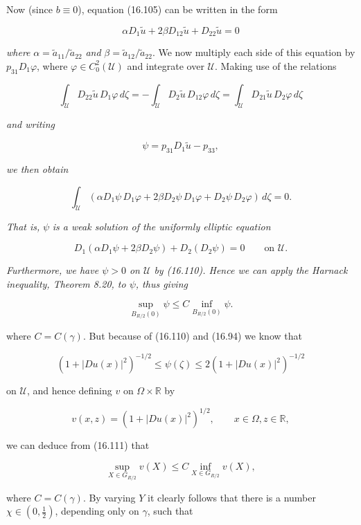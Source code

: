Now (since $b \equiv 0$), equation (16.105) can be written in the form

\[
\alpha D_1 \tilde u + 2\beta D_{12}\tilde u + D_{22}\tilde u = 0
\]

\emph{where} $\alpha = \tilde a_{11}/\tilde a_{22}$ \emph{and} $\beta = \tilde a_{12}/\tilde a_{22}$.
We now multiply each side of this equation by $p_{31}D_1\varphi$, where
$\varphi \in C_0^2(\mathcal U)$ and integrate over $\mathcal U$.
Making use of the relations

\[
\int_{\mathcal U} D_{22}\tilde u\,D_1\varphi\,d\zeta
= -\int_{\mathcal U} D_2\tilde u\,D_{12}\varphi\,d\zeta
= \int_{\mathcal U} D_{21}\tilde u\,D_2\varphi\,d\zeta
\]

\emph{and writing}

\[
\psi = p_{31}D_1\tilde u - p_{33},
\]

\emph{we then obtain}

\[
\int_{\mathcal U} \left(\alpha D_1\psi\,D_1\varphi + 2\beta D_2\psi\,D_1\varphi + D_2\psi\,D_2\varphi\right)\,d\zeta = 0.
\]

\emph{That is,} $\psi$ \emph{is a weak solution of the uniformly elliptic equation}

\[
D_1(\alpha D_1\psi + 2\beta D_2\psi) + D_2(D_2\psi)=0
\qquad \text{on } \mathcal U.
\]

\emph{Furthermore, we have $\psi > 0$ on $\mathcal U$ by (16.110). Hence we can apply the Harnack
inequality, Theorem 8.20, to $\psi$, thus giving}

\begin{equation}
\sup_{B_{R/2}(0)} \psi \le C \inf_{B_{R/2}(0)} \psi.
\tag{16.111}
\end{equation}



where $C=C(\gamma)$. But because of (16.110) and (16.94) we know that

\[
(1+|Du(x)|^2)^{-1/2}\leq \psi(\zeta)\leq 2(1+|Du(x)|^2)^{-1/2}
\]

on $\mathcal{U}$, and hence defining $v$ on $\Omega\times\mathbb{R}$ by

\[
v(x,z)=(1+|Du(x)|^2)^{1/2}, \qquad x\in \Omega, z\in \mathbb{R},
\]

we can deduce from (16.111) that

\[
\sup_{X\in G_{R/2}} v(X)\leq C \inf_{X\in G_{R/2}} v(X),
\]

where $C=C(\gamma)$. By varying $Y$ it clearly follows that there is a number $\chi\in (0,\frac12)$,
depending only on $\gamma$, such that

